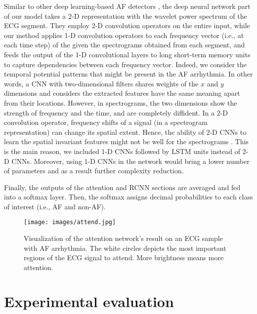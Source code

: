\documentclass[conference]{IEEEtran}
\begin{document}
Similar to other deep learning-based AF detectors \cite{xia2018detecting,he2018automatic}, the deep neural network part of our model takes a 2-D representation with the wavelet power spectrum of the ECG segment. They employ 2-D convolution operators on the entire input, while our method applies 1-D convolution operators to each frequency vector (i.e., at each time step) of the given the spectrograms obtained from each segment, and feeds the output of the 1-D convolutional layers to long short-term memory units to capture dependencies between each frequency vector. Indeed, we consider the temporal potential patterns that might be present in the AF arrhythmia. In other words, a CNN with two-dimensional filters shares weights of the $x$ and $y$ dimensions and considers the extracted features have the same meaning apart from their locations. However, in spectrograms, the two dimensions show the strength of frequency and the time, and are completely diffident. In a 2-D convolution operator, frequency shifts of a signal (in a spectrogram representation) can change its spatial extent. Hence, the ability of 2-D CNNs to learn the spatial invariant features might not be well for the spectrograms \cite{wyse2017audio}. This is the main reason, we included 1-D CNNs followed by LSTM units instead of 2-D CNNs. Moreover, using 1-D CNNs in the network would bring a lower number of parameters and as a result further complexity reduction.



Finally, the outputs of the attention and RCNN sections are averaged and fed into a softmax layer. Then, the softmax assigns decimal probabilities to each class of interest (i.e., AF and non-AF).  

\begin{figure*}[t!]
\centering
  \texttt{[image: images/attend.jpg]}
  \caption{Visualization of the attention network's result on an ECG sample with AF arrhythmia. The white circles depicts the most important regions of the ECG signal to attend. More brightness means more attention.  }
  \label{fig:attend}

\end{figure*}  
\section{Experimental evaluation}
\label{sec:experimental}
\end{document}
